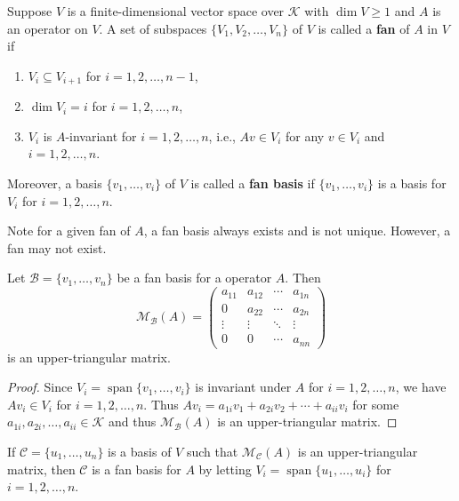 \documentclass{ctexart}
\begin{document}
    \begin{mydef}
        Suppose $V$ is a finite-dimensional vector space over $\mathcal K$ with $\dim V\ge 1$ and $A$ is an operator on $V$. A set of subspaces $\{ V_1, V_2, \ldots, V_n \}$ of $V$ is called a \textbf{fan} of $A$ in $V$ if
        \begin{enumerate}[label=(\arabic*)]
            \item $V_i \subseteq V_{i+1}$ for $i=1,2,\ldots,n-1$,
            \item $\dim V_i = i$ for $i=1,2,\ldots,n$,
            \item $V_i$ is $A$-invariant for $i=1,2,\ldots,n$, i.e., $A v \in V_i$ for any $v\in V_i$ and $i=1,2,\ldots,n$.
        \end{enumerate}
        Moreover, a basis $\{ v_1, \ldots, v_i \}$ of $V$ is called a \textbf{fan basis} if $\{ v_1, \ldots, v_i \}$ is a basis for $V_i$ for $i=1,2,\ldots,n$.
    \end{mydef}
    \begin{myrmk}
        Note for a given fan of $A$, a fan basis always exists and is not unique. However, a fan may not exist.
    \end{myrmk}
    \begin{mythm}
        Let $\mathcal{B} = \{v_1, \ldots, v_n\}$ be a fan basis for a operator $A$. Then $$\mathcal{M}_\mathcal{B} (A) = \begin{pmatrix}
            a_{11} & a_{12} & \cdots & a_{1n} \\
            0 & a_{22} & \cdots & a_{2n} \\
            \vdots & \vdots & \ddots & \vdots \\
            0 & 0 & \cdots & a_{nn}
        \end{pmatrix}$$ is an upper-triangular matrix.
    \end{mythm}
    \begin{proof}
        Since $V_i = \operatorname{span}\{ v_1, \ldots, v_i \}$ is invariant under $A$ for $i=1,2,\ldots,n$, we have $A v_i \in V_i$ for $i=1,2,\ldots,n$. Thus $A v_i = a_{1i} v_1 + a_{2i} v_2 + \cdots + a_{ii} v_i$ for some $a_{1i}, a_{2i}, \ldots, a_{ii} \in \mathcal K$ and thus $\mathcal{M}_\mathcal{B}(A)$ is an upper-triangular matrix.
    \end{proof}
    \begin{myrmk}
        If $\mathcal C = \{ u_1, \ldots, u_n \}$ is a basis of $V$ such that $\mathcal M_\mathcal{C}(A)$ is an upper-triangular matrix, then $\mathcal C$ is a fan basis for $A$ by letting $V_i = \operatorname{span} \{ u_1, \ldots, u_i \}$ for $i=1,2,\ldots,n$.
    \end{myrmk}
\end{document}
